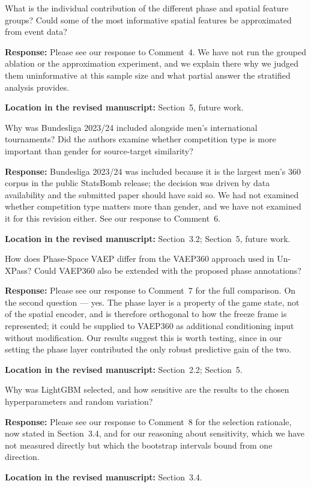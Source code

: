 \documentclass[11pt,a4paper]{article}
\newcommand{\response}[2]{%
  \begin{responsebox}
  \textbf{Response:}
  #1
  \end{responsebox}
  \begin{locationbox}
  \textbf{Location in the revised manuscript:}
  #2
  \end{locationbox}
}
\begin{document}
\begin{reviewbox}[Question 4]
What is the individual contribution of the different phase and spatial feature groups? Could some of the most informative spatial features be approximated from event data?
\end{reviewbox}
\response{Please see our response to Comment~4. We have not run the grouped ablation or the approximation experiment, and we explain there why we judged them uninformative at this sample size and what partial answer the stratified analysis provides.}{Section~5, future work.}

\begin{reviewbox}[Question 5]
Why was Bundesliga 2023/24 included alongside men's international tournaments? Did the authors examine whether competition type is more important than gender for source-target similarity?
\end{reviewbox}
\response{Bundesliga 2023/24 was included because it is the largest men's 360 corpus in the public StatsBomb release; the decision was driven by data availability and the submitted paper should have said so. We had not examined whether competition type matters more than gender, and we have not examined it for this revision either. See our response to Comment~6.}{Section~3.2; Section~5, future work.}

\begin{reviewbox}[Question 6]
How does Phase-Space VAEP differ from the VAEP360 approach used in Un-XPass? Could VAEP360 also be extended with the proposed phase annotations?
\end{reviewbox}
\response{Please see our response to Comment~7 for the full comparison. On the second question --- yes. The phase layer is a property of the game state, not of the spatial encoder, and is therefore orthogonal to how the freeze frame is represented; it could be supplied to VAEP360 as additional conditioning input without modification. Our results suggest this is worth testing, since in our setting the phase layer contributed the only robust predictive gain of the two.}{Section~2.2; Section~5.}

\begin{reviewbox}[Question 7]
Why was LightGBM selected, and how sensitive are the results to the chosen hyperparameters and random variation?
\end{reviewbox}
\response{Please see our response to Comment~8 for the selection rationale, now stated in Section~3.4, and for our reasoning about sensitivity, which we have not measured directly but which the bootstrap intervals bound from one direction.}{Section~3.4.}
\end{document}
